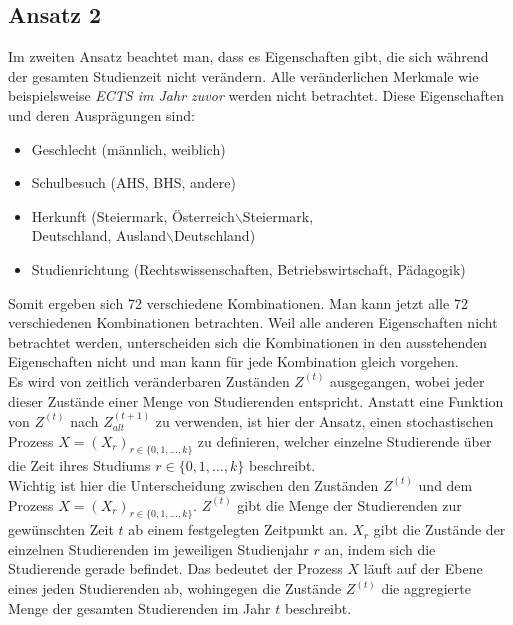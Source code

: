 \subsection{Ansatz 2}
\label{sec:appr2}

Im zweiten Ansatz beachtet man, dass es Eigenschaften gibt, die sich w\"ahrend der gesamten Studienzeit nicht verändern. Alle ver\"anderlichen Merkmale 
wie beispielsweise \textit{ECTS im Jahr zuvor} werden nicht betrachtet.
Diese Eigenschaften und deren Ausprägungen sind:

\begin{itemize}
  \item Geschlecht (männlich, weiblich)
  \item Schulbesuch (AHS, BHS, andere)
  \item Herkunft (Steiermark, Österreich$\backslash$Steiermark, \\
        Deutschland, Ausland$\backslash$Deutschland)
  \item Studienrichtung (Rechtswissenschaften, Betriebswirtschaft, P\"adagogik)
\end{itemize}

Somit ergeben sich 72 verschiedene Kombinationen. Man kann jetzt alle 72 verschiedenen
Kombinationen betrachten. Weil alle anderen Eigenschaften nicht betrachtet werden, unterscheiden sich die Kombinationen in den
ausstehenden Eigenschaften nicht und man kann für jede Kombination gleich vorgehen. \\


Es wird von zeitlich ver\"anderbaren Zuständen $Z^{(t)}$ ausgegangen, wobei jeder dieser 
Zustände einer Menge von Studierenden entspricht. Anstatt eine Funktion von $Z^{(t)}$ nach $Z_{alt}^{(t+1)}$
zu verwenden, ist hier der Ansatz, einen stochastischen Prozess $X = (X_r)_{r \in \{ 0,1, \dots, k \} }$ zu definieren, welcher einzelne Studierende \"uber 
die Zeit ihres Studiums $r \in \{0,1, \dots , k\}$ beschreibt. \\

Wichtig ist hier die Unterscheidung zwischen den Zuständen $Z^{(t)}$ und dem Prozess $X = (X_r)_{r \in \{ 0,1, \dots, k \} }$. 
$Z^{(t)}$ gibt die Menge der Studierenden zur gewünschten Zeit $t$ ab einem festgelegten Zeitpunkt an. 
$X_r$ gibt die Zustände der einzelnen Studierenden im jeweiligen Studienjahr $r$ an, indem sich die Studierende gerade befindet.
Das bedeutet der Prozess $X$ l\"auft auf der Ebene eines jeden Studierenden ab, wohingegen
die Zust\"ande $Z^{(t)}$ die aggregierte Menge der gesamten Studierenden im Jahr $t$ beschreibt.




